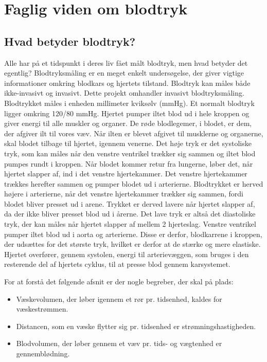 \chapter{Faglig viden om blodtryk}
\section{Hvad betyder blodtryk?} 
Alle har på et tidspunkt i deres liv fået målt blodtryk, men hvad betyder det egentlig?
Blodtryksmåling er en meget enkelt undersøgelse, der giver vigtige informationer omkring blodkars og hjertets tilstand. Blodtryk kan måles både ikke-invasivt og invasivt. Dette projekt omhandler invasivt blodtryksmåling. 
Blodtrykket måles i enheden millimeter kviksølv (mmHg). Et normalt blodtryk ligger omkring 120/80 mmHg. 
Hjertet pumper iltet blod ud i hele kroppen og giver energi til alle muskler og organer. De røde blodlegemer, i blodet, er dem, der afgiver ilt til vores væv. Når ilten er blevet afgivet til musklerne og organerne, skal blodet tilbage til hjertet, igennem venerne.  
Det høje tryk er det systoliske tryk, som kan måles når den venstre ventrikel trækker sig sammen og iltet blod pumpes rundt i kroppen. 
Når blodet kommer retur fra lungerne, løber det, når hjertet slapper af, ind i det venstre hjertekammer. Det venstre hjertekammer trækkes herefter sammen og pumper blodet ud i arterierne. Blodtrykket er herved højere i arterierne, når det venstre hjertekammer trækker sig sammen, fordi blodet bliver presset ud i arene. Trykket er derved lavere når hjertet slapper af, da der ikke bliver presset blod ud i årerne. 
Det lave tryk er altså det diastoliske tryk, der kan måles når hjertet slapper af mellem 2 hjerteslag. 
Venstre ventrikel pumper iltet blod ud i aorta og arterierne. Disse er derfor, blodkarrene i kroppen, der udsættes for det største tryk, hvilket er derfor at de stærke og mere elastiske. 
Hjertet overfører, gennem systolen, energi til arterievæggen, som bruges i den resterende del af hjertets cyklus, til at presse blod gennem karsystemet. 

For at forstå det følgende afsnit er der nogle begreber, der skal på plads: 
\begin{itemize}
\item Væskevolumen, der løber igennem et rør pr. tidsenhed, kaldes for væskestrømmen.
\item Distancen, som en væske flytter sig pr. tidsenhed er strømningshastigheden.
\item Blodvolumen, der løber gennem et væv pr. tids- og vægtenhed er gennemblødning.
\end{itemize}

